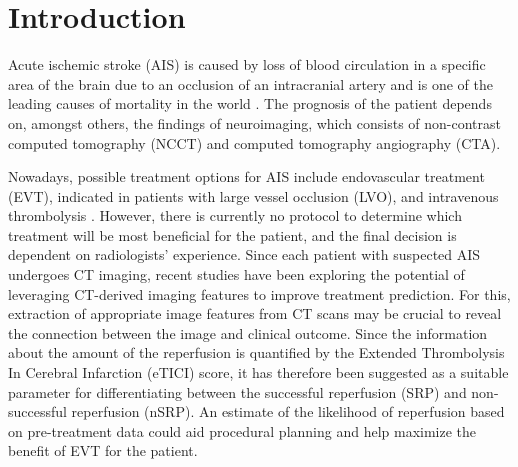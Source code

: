 \documentclass[preprint,12pt]{elsarticle}
\begin{document}

\section{Introduction}
\label{sec1}

Acute ischemic stroke (AIS) is caused by loss of blood circulation in a specific area of the brain due to an occlusion of an intracranial artery and is one of the leading causes of mortality in the world \cite{Phipps2020}. The prognosis of the patient depends on, amongst others, the findings of neuroimaging, which consists of non-contrast computed tomography (NCCT) and computed tomography angiography (CTA).

Nowadays, possible treatment options for AIS include endovascular treatment (EVT), indicated in patients with large vessel occlusion (LVO), and intravenous thrombolysis \cite{Powers2020}. However, there is currently no protocol to determine which treatment will be most beneficial for the patient, and the final decision is dependent on radiologists' experience. Since each patient with suspected AIS undergoes CT imaging, recent studies have been exploring the potential of leveraging CT-derived imaging features to improve treatment prediction. For this, extraction of appropriate image features from CT scans may be crucial to reveal the connection between the image and clinical outcome. Since the information about the amount of the reperfusion is quantified by the Extended Thrombolysis In Cerebral Infarction (eTICI) score, it has therefore been suggested as a suitable parameter for differentiating between the successful reperfusion (SRP) and non-successful reperfusion (nSRP). An estimate of the likelihood of reperfusion based on pre-treatment data could aid procedural planning and help maximize the benefit of EVT for the patient.

\end{document}
